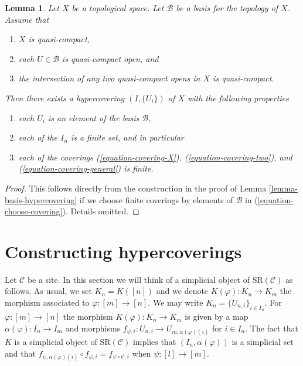 \documentclass{stacks-project}
\theoremstyle{plain}
\newtheorem{lemma}[subsection]{Lemma}
\theoremstyle{definition}
\theoremstyle{remark}
\numberwithin{equation}{subsection}
\begin{document}
\begin{lemma}
\label{lemma-quasi-separated-quasi-compact-hypercovering}
Let $X$ be a topological space.
Let $\mathcal{B}$ be a basis for the topology of $X$.
Assume that
\begin{enumerate}
\item $X$ is quasi-compact,
\item each $U \in \mathcal{B}$ is quasi-compact open, and
\item the intersection of any two quasi-compact opens in
$X$ is quasi-compact.
\end{enumerate}
Then there exists a hypercovering $(I, \{U_i\})$ of $X$ with the
following properties
\begin{enumerate}
\item each $U_i$ is an element of the basis $\mathcal{B}$,
\item each of the $I_n$ is a finite set, and in particular
\item each of the coverings  (\ref{equation-covering-X}),
(\ref{equation-covering-two}), and (\ref{equation-covering-general})
is finite.
\end{enumerate}
\end{lemma}

\begin{proof}
This follows directly from the construction in the proof of
Lemma \ref{lemma-basis-hypercovering} if we choose finite coverings
by elements of $\mathcal{B}$ in (\ref{equation-choose-covering}).
Details omitted.
\end{proof}







\section{Constructing hypercoverings}
\label{section-hypercovering-sites}

\noindent
Let $\mathcal{C}$ be a site. In this section we will think of a
simplicial object of $\text{SR}(\mathcal{C})$ as follows.
As usual, we set $K_n = K([n])$ and we denote $K(\varphi) : K_n \to K_m$
the morphism associated to $\varphi : [m] \to [n]$.
We may write $K_n = \{U_{n, i}\}_{i \in I_n}$. For
$\varphi : [m] \to [n]$ the morphism $K(\varphi) : K_n \to K_m$
is given by a map $\alpha(\varphi) : I_n \to I_m$ and morphisms
$f_{\varphi, i} : U_{n, i} \to U_{m, \alpha(\varphi)(i)}$
for $i \in I_n$. The fact that $K$ is a simplicial object of
$\text{SR}(\mathcal{C})$ implies that $(I_n, \alpha(\varphi))$
is a simplicial set
and that $f_{\psi, \alpha(\varphi)(i)} \circ f_{\varphi, i} =
f_{\varphi \circ \psi, i}$ when $\psi : [l] \to [m]$.
\end{document}
